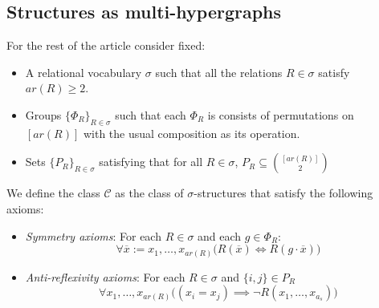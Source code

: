 \documentclass[12pt,notitlepage,a4paper]{article}
\theoremstyle{definition}
\begin{document}
\subsection{Structures as multi-hypergraphs} \label{sect:structures}

For the rest of the article consider fixed:
\begin{itemize}
	\item A relational vocabulary $\sigma$ such 
	that all the relations $R\in\sigma$ satisfy $ar(R)\geq 2$. 
	\item 
	Groups $\{ \Phi_R \}_{R\in \sigma}$
	such that each $\Phi_R$ is consists of 
	permutations on $[ar(R)]$ with the usual 
	composition as its operation.	
	\item 
	Sets $\{P_R\}_{R\in \sigma}$ satisfying that for 
	all $R\in \sigma$, 
	$P_R\subseteq \binom{[ar(R)]}{2}$
	
	
\end{itemize}
%



We define the class $\mathcal{C}$ as the 
class of $\sigma$-structures that
satisfy the 
following axioms: 
\begin{itemize}
	\item \textit{Symmetry axioms}: For each $R\in \sigma$ and
	each $g\in \Phi_R$:
	\[ \forall \overline{x}:=x_1,\dots, x_{ar(R)} \big(  R(\overline{x})
	\iff R(g\cdot\overline{x}) \big)    \]
	\item \textit{Anti-reflexivity axioms}: For each 
	$R\in \sigma$ and $\{i,j\}\in P_R$
	\[ \forall x_1,\dots, x_{ar(R)} 
	\big( (x_i=x_j) \implies \neg R(x_1,\dots, x_{a_s})
	\big)\]
\end{itemize}
\end{document}
